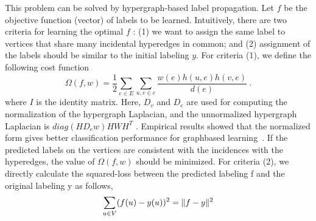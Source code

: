 This problem can be solved by hypergraph-based label propagation. Let $f$ be the objective function (vector) of labels to be learned. Intuitively, there are two criteria for learning the optimal $f$ : (1) we want to assign the same label to vertices that share many incidental hyperedges in common; and (2) assignment of the labels should be similar to the initial labeling $y$. For criteria (1), we define the following cost function
\begin{equation}
\Omega(f,w)=\frac{1}{2}\sum_{e\in E}\sum_{u,v\in e}\frac{w(e)h(u,e)h(v,e)}{d(e)} ~.
\end{equation}
where $I$ is the identity matrix. Here, $D_v$ and $D_e$ are used for computing the normalization of the hypergraph Laplacian, and the unnormalized hypergraph Laplacian is $diag(HD_ew)HWH^T$ . Empirical results showed that the normalized form gives better classification performance for graphbased learning~\cite{Zhou2006}. If the predicted labels on the vertices are consistent with the incidences with the hyperedges, the value of $\Omega(f,w)$ should be minimized. For criteria (2), we directly calculate the squared-loss between the predicted labeling f and the original labeling y as follows,
\begin{equation}
\notag \sum_{u\in V}(f(u)-y(u))^2=\|f-y\|^2
\end{equation}
